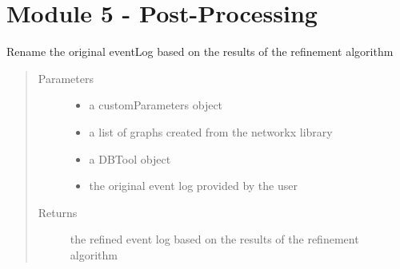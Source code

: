 \documentclass[letterpaper,10pt,english]{sphinxmanual}
\begin{document}
\begin{DUlineblock}{0em}
\item[] 
\end{DUlineblock}

{\hyperref[\detokenize{index:mastertoc}]{}}


\chapter{Module 5 - Post-Processing}
\label{\detokenize{postprocessing:module-5-post-processing}}\label{\detokenize{postprocessing::doc}}
\begin{DUlineblock}{0em}
\item[] 
\end{DUlineblock}

\begin{fulllineitems}
\label{\detokenize{postprocessing:eventLogProcessing.postProcessing.eventLogRenaming}}
Rename the original eventLog based on the results of the refinement algorithm
\begin{quote}\begin{description}
\item[{Parameters}] \leavevmode\begin{itemize}
\item {} 
 \textendash{} a customParameters object

\item {} 
 \textendash{} a list of graphs created from the networkx library

\item {} 
 \textendash{} a DBTool object

\item {} 
 \textendash{} the original event log provided by the user

\end{itemize}

\item[{Returns}] \leavevmode
the refined event log based on the results of the refinement algorithm

\end{description}\end{quote}

\end{fulllineitems}
\end{document}
